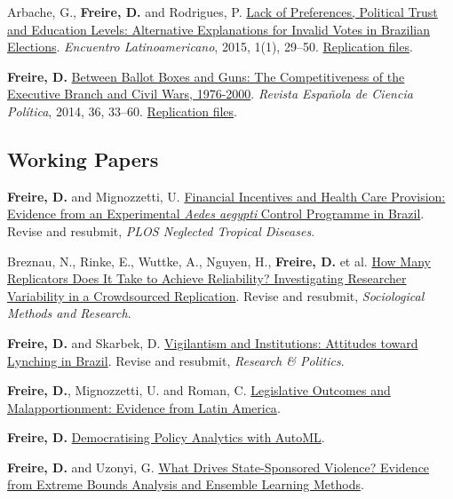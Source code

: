 \documentclass[a4paper]{article}
\renewenvironment{itemize}{
	\begin{list}{}{
			\setlength{\leftmargin}{1.5em}
		}
		}{
	\end{list}
}
\begin{document}
\begin{itemize}
\item Arbache, G., \textbf{Freire, D.} and Rodrigues, P. \href{http://www.iapss.org/wp-content/uploads/2014/10/ELA1.1_2.Lack-of-Preferences-Political-Trust-and-Education-Levels.pdf}{Lack of Preferences, Political Trust and Education Levels: Alternative Explanations for Invalid Votes in Brazilian Elections}. \textit{Encuentro Latinoamericano}, 2015, 1(1), 29--50. \href{https://github.com/danilofreire/invalid-votes-brazil}{Replication files}.
\item \textbf{Freire, D.} \href{http://recyt.fecyt.es/index.php/recp/article/view/37638}{Between Ballot Boxes and Guns: The Competitiveness of the Executive Branch and Civil Wars, 1976-2000}. \textit{Revista Española de Ciencia Política}, 2014, 36, 33--60. \href{https://doi.org/10.7910/DVN/NSDUYG}{Replication files}.
\end{itemize}

\subsection*{Working Papers}

\begin{itemize}
\item \textbf{Freire, D.} and Mignozzetti, U. \href{https://github.com/danilofreire/incentives-healthcare}{Financial Incentives and Health Care Provision: Evidence from an Experimental \textit{Aedes aegypti} Control Programme in Brazil}. Revise and resubmit, \textit{PLOS Neglected Tropical Diseases}.
\item Breznau, N., Rinke, E., Wuttke, A., Nguyen, H., \textbf{Freire, D.} et al. \href{https://osf.io/preprints/socarxiv/j7qta/}{How Many Replicators Does It Take to Achieve Reliability? Investigating Researcher Variability in a Crowdsourced Replication}. Revise and resubmit, \textit{Sociological Methods and Research}. 
\item \textbf{Freire, D.} and Skarbek, D. \href{https://github.com/danilofreire/lynching-experiment-brazil}{Vigilantism and Institutions: Attitudes toward Lynching in Brazil}. Revise and resubmit, \textit{Research \& Politics}.
\item \textbf{Freire, D.}, Mignozzetti, U. and Roman, C. \href{https://github.com/danilofreire/danilofreire.github.io/blob/master/malapportionment.pdf}{Legislative Outcomes and Malapportionment: Evidence from Latin America}.
\item \textbf{Freire, D.} \href{https://github.com/danilofreire/mercatus-analytics-papers/blob/main/automl-paper/automl.pdf}{Democratising Policy Analytics with AutoML}. 
\item \textbf{Freire, D.} and Uzonyi, G. \href{https://osf.io/pzx3q}{What Drives State-Sponsored Violence? Evidence from Extreme Bounds Analysis and Ensemble Learning Methods}.
\end{itemize}
\end{document}
